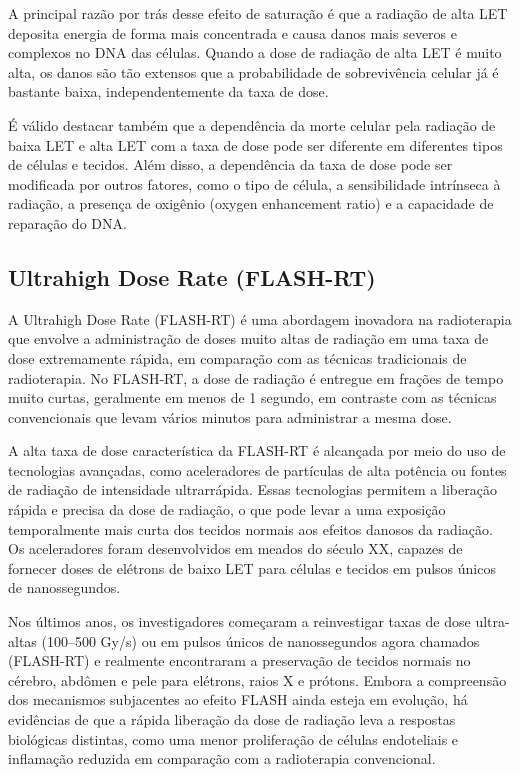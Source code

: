 \documentclass[11pt,a4paper]{article}
\begin{document}
	A principal razão por trás desse efeito de saturação é que a radiação de alta LET deposita energia de forma mais concentrada e causa danos mais severos e complexos no DNA das células. Quando a dose de radiação de alta LET é muito alta, os danos são tão extensos que a probabilidade de sobrevivência celular já é bastante baixa, independentemente da taxa de dose.

	É válido destacar também que a dependência da morte celular pela radiação de baixa LET e alta LET com a taxa de dose pode ser diferente em diferentes tipos de células e tecidos. Além disso, a dependência da taxa de dose pode ser modificada por outros fatores, como o tipo de célula, a sensibilidade intrínseca à radiação, a presença de oxigênio (oxygen enhancement ratio) e a capacidade de reparação do DNA.

\subsection*{Ultrahigh Dose Rate (FLASH-RT)}

	A Ultrahigh Dose Rate (FLASH-RT) é uma abordagem inovadora na radioterapia que envolve a administração de doses muito altas de radiação em uma taxa de dose extremamente rápida, em comparação com as técnicas tradicionais de radioterapia. No FLASH-RT, a dose de radiação é entregue em frações de tempo muito curtas, geralmente em menos de 1 segundo, em contraste com as técnicas convencionais que levam vários minutos para administrar a mesma dose.

	A alta taxa de dose característica da FLASH-RT é alcançada por meio do uso de tecnologias avançadas, como aceleradores de partículas de alta potência ou fontes de radiação de intensidade ultrarrápida. Essas tecnologias permitem a liberação rápida e precisa da dose de radiação, o que pode levar a uma exposição temporalmente mais curta dos tecidos normais aos efeitos danosos da radiação. Os aceleradores foram desenvolvidos em meados do século XX, capazes de fornecer doses de elétrons de baixo LET para células e tecidos em pulsos únicos de nanossegundos.

	Nos últimos anos, os investigadores começaram a reinvestigar taxas de dose ultra-altas (100–500 Gy/s) ou em pulsos únicos de nanossegundos agora chamados (FLASH-RT) e realmente encontraram a preservação de tecidos normais no cérebro, abdômen e pele para elétrons, raios X e prótons. Embora a compreensão dos mecanismos subjacentes ao efeito FLASH ainda esteja em evolução, há evidências de que a rápida liberação da dose de radiação leva a respostas biológicas distintas, como uma menor proliferação de células endoteliais e inflamação reduzida em comparação com a radioterapia convencional. 
\end{document}
